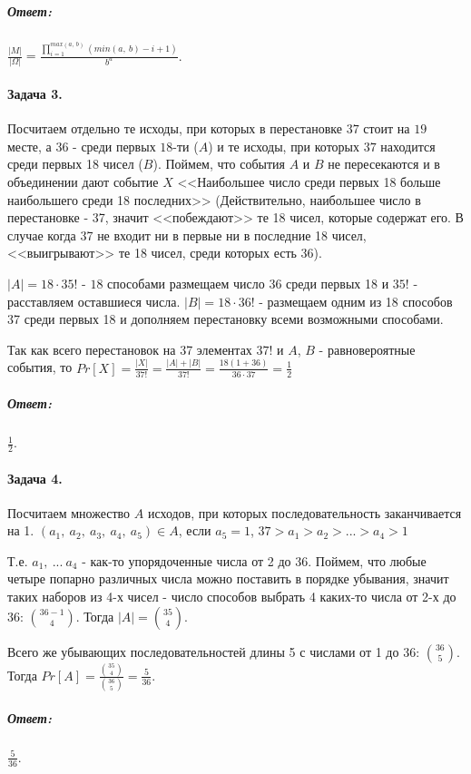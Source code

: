 \documentclass{article}
\begin{document}
 	\subparagraph{Ответ:}  $\frac{|M|}{|\Omega|} = \frac{\prod_{i=1}^{max(a,\ b)} (min(a,\ b) - i + 1)}{b^a}$.
 	
 	\paragraph{Задача 3.}
 	Посчитаем отдельно те исходы, при которых в перестановке $37$ стоит на $19$ месте, а $36$ - среди первых $18$-ти ($A$) и те исходы, при которых $37$ находится среди первых 18 чисел ($B$). Поймем, что события $A$ и $B$ не пересекаются и в объединении дают событие $X$ <<Наибольшее число среди первых 18 больше наибольшего среди 18 последних>> (Действительно, наибольшее число в перестановке - 37, значит <<побеждают>> те 18 чисел, которые содержат его. В случае когда 37 не входит ни в первые ни в последние 18 чисел, <<выигрывают>> те 18 чисел, среди которых есть 36).
 	
 	$|A| = 18 \cdot 35!$ - $18$ способами размещаем число 36 среди первых 18 и $35!$ - расставляем оставшиеся числа. $|B| = 18 \cdot 36!$ - размещаем одним из 18 способов 37 среди первых 18 и дополняем перестановку всеми возможными способами.
 	
 	Так как всего перестановок на 37 элементах $37!$ и $A$, $B$ - равновероятные события, то $Pr[X] = \frac{|X|}{37!} = \frac{|A| + |B|}{37!} = \frac{18(1 + 36)}{36\cdot37} = \frac{1}{2}$
 	
 	\subparagraph{Ответ:} $\frac{1}{2}$.
 	
 	\paragraph{Задача 4.}
 	Посчитаем множество $A$ исходов, при которых последовательность заканчивается на 1. $(a_1,\ a_2,\ a_3,\ a_4,\ a_5) \in A$, если $a_5 = 1$, $37 > a_1 > a_2 > ... > a_4 > 1$
 	
 	Т.е. $a_1,\ ...\ a_4$ - как-то упорядоченные числа от 2 до 36. Поймем, что любые четыре попарно различных числа можно поставить в порядке убывания, значит таких наборов из 4-х чисел - число способов выбрать 4 каких-то числа от 2-х до 36: ${36 - 1 \choose 4}$. Тогда $|A| = {35 \choose 4}$.
 	
 	Всего же убывающих последовательностей длины 5 с числами от 1 до 36: ${36 \choose 5}$. Тогда $Pr[A] = \frac{{35 \choose 4}}{{36 \choose 5}} = \frac{5}{36}$.
 	
 	\subparagraph{Ответ:} $\frac{5}{36}$.
 	
\end{document}
